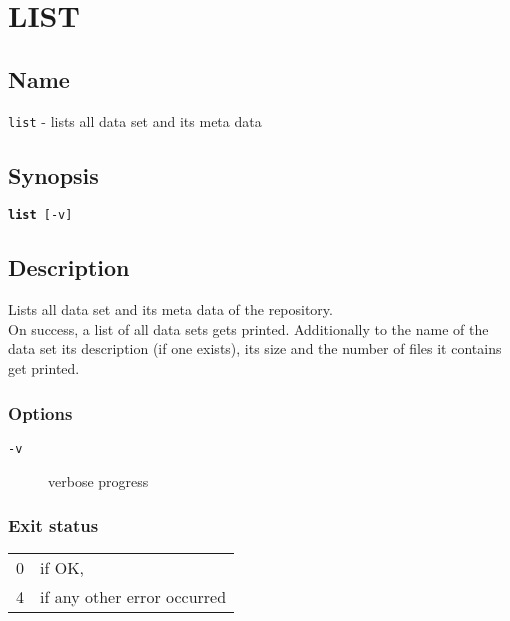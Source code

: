 \documentclass{article} %
\begin{document}
		\section*{LIST}
		\subsection*{Name}
		\texttt{list} - lists all data set and its meta data
		\subsection*{Synopsis}
		\texttt{\textbf{list} [-v]}
		\subsection*{Description}
		Lists all data set and its meta data of the repository.\\
		
		\noindent On success, a list of all data sets gets printed. Additionally to the name of the data set its description (if one exists), its size and the number of files it contains get printed.
		\subsubsection*{Options}
		\begin{description}
			\item[\texttt{-v}] verbose progress
		\end{description}
		
		\subsubsection*{Exit status}
		\begin{tabular}{ll}
			0 &  if OK,\\ 
			4 &  if any other error occurred\\
		\end{tabular}
		\newpage
		
\end{document}
